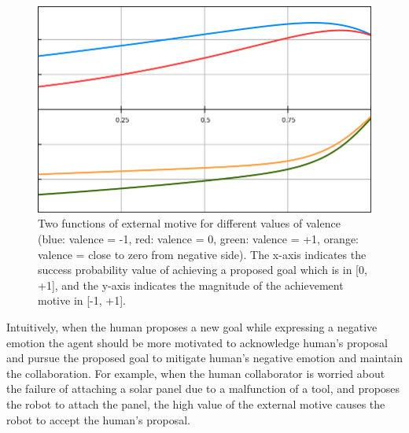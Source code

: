 \documentclass[12pt]{report}
\begin{document}
\begin{figure}[tbh]
  \centering
  \includegraphics[width=1\textwidth]{figure/external_motive_functions.png}
  \caption{Two functions of external motive for different values of valence
  (blue: valence = -1, red: valence = 0, green: valence = +1, orange: valence =
  close to zero from negative side). The x-axis indicates the success
  probability value of achieving a proposed goal which is in [0, +1], and the
  y-axis indicates the magnitude of the achievement motive in [-1, +1].}
  \label{fig:external-motive-functions}
\end{figure}

Intuitively, when the human proposes a new goal while expressing a negative
emotion the agent should be more motivated to acknowledge human's proposal and
pursue the proposed goal to mitigate human's negative emotion and maintain the
collaboration. {\color{red}For example, when the human collaborator is worried
about the failure of attaching a solar panel due to a malfunction of a tool,
and proposes the robot to attach the panel, the high value of the external
motive causes the robot to accept the human's proposal.}
\end{document}
